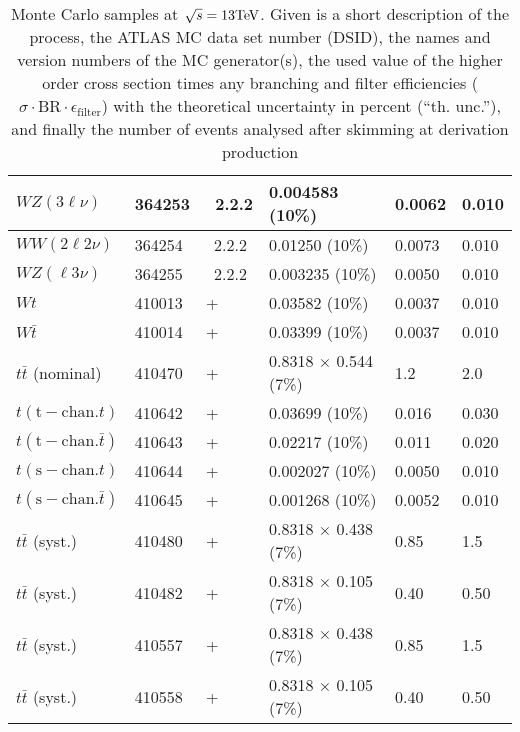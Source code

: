\begin{table}[htbp]
\begin{center}
\begin{tabular}{l|l|l|l|l|l}
    			$ WZ (3\ell\nu) $ & 364253 & \Sherpa\ 2.2.2 & 0.004583 (10\%)  & 0.0062 & 0.010 \\\hline
    			$ WW (2\ell 2\nu) $ & 364254 & \Sherpa\ 2.2.2 & 0.01250 (10\%)  & 0.0073 & 0.010 \\\hline
    			$ WZ (\ell 3\nu) $ & 364255 & \Sherpa\ 2.2.2 & 0.003235 (10\%)  & 0.0050 & 0.010 \\\hline\hline
    			$ Wt $ & 410013 & \Powheg+\Pythia & 0.03582 (10\%)  & 0.0037 & 0.010 \\\hline
    			$ W\bar{t} $ & 410014 & \Powheg+\Pythia & 0.03399 (10\%)  & 0.0037 & 0.010 \\\hline
    			$ t\bar{t} $ (nominal) & 410470 & \Powheg+\Pythia & 0.8318 $\times$ 0.544 (7\%)  & 1.2 & 2.0 \\\hline
    			$ t (\mathrm{t-chan.} t) $ & 410642 & \Powheg+\Pythia & 0.03699 (10\%)  & 0.016 & 0.030 \\\hline
    			$ t (\mathrm{t-chan.} \bar{t}) $ & 410643 & \Powheg+\Pythia & 0.02217 (10\%)  & 0.011 & 0.020 \\\hline
    			$ t (\mathrm{s-chan.} t) $ & 410644 & \Powheg+\Pythia & 0.002027 (10\%)  & 0.0050 & 0.010 \\\hline
    			$ t (\mathrm{s-chan.} \bar{t}) $ & 410645 & \Powheg+\Pythia & 0.001268 (10\%)  & 0.0052 & 0.010 \\\hline\hline
    			$ t\bar{t} $ (syst.) & 410480 & \Powheg+\Pythia & 0.8318 $\times$ 0.438 (7\%)  & 0.85 & 1.5 \\\hline
    			$ t\bar{t} $ (syst.) & 410482 & \Powheg+\Pythia & 0.8318 $\times$ 0.105 (7\%)  & 0.40 & 0.50 \\\hline
    			$ t\bar{t} $ (syst.) & 410557 & \Powheg+\Pythia & 0.8318 $\times$ 0.438 (7\%)  & 0.85 & 1.5 \\\hline
    			$ t\bar{t} $ (syst.) & 410558 & \Powheg+\Pythia & 0.8318 $\times$ 0.105 (7\%)  & 0.40 & 0.50 \\\hline
    			\hline
    		\end{tabular}
    		\caption{Monte Carlo samples at $\sqrt{s} = 13\text{Te\kern -0.1em V}$. Given is a
    			short description of the process, the ATLAS MC data set number
    			(DSID), the names and version numbers of the MC generator(s),
    			the used value of the higher order cross section times
    			any branching and filter efficiencies ($\sigma{\cdot}
    			\text{BR}{\cdot}\epsilon_\mathrm{filter}$) with the
    			theoretical uncertainty in percent (``th. unc.''),
    			and finally the number of events analysed
    			after skimming at derivation production
}
\end{center}
\end{table}
